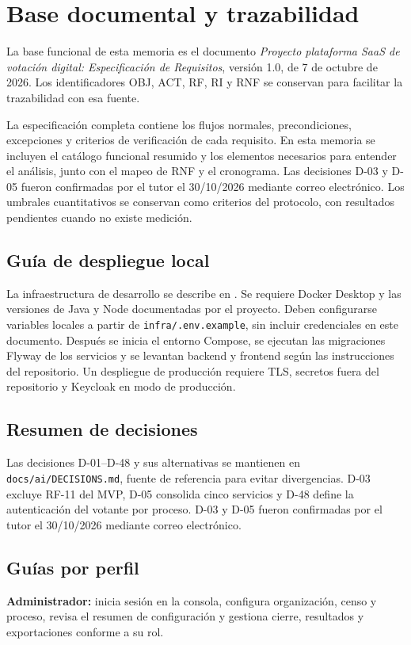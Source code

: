 \chapter{Base documental y trazabilidad}
\label{ap:base-documental}

La base funcional de esta memoria es el documento
\emph{Proyecto plataforma SaaS de votación digital: Especificación de
Requisitos}, versión 1.0, de 7 de octubre de 2026. Los identificadores OBJ,
ACT, RF, RI y RNF se conservan para facilitar la trazabilidad con esa fuente.

La especificación completa contiene los flujos normales, precondiciones,
excepciones y criterios de verificación de cada requisito. En esta memoria se
incluyen el catálogo funcional resumido y los elementos necesarios para
entender el análisis, junto con el mapeo de RNF y el cronograma. Las decisiones
D-03 y D-05 fueron confirmadas por el tutor el 30/10/2026 mediante correo
electrónico. Los umbrales
cuantitativos se conservan como criterios del protocolo, con resultados
pendientes cuando no existe medición.

\section{Guía de despliegue local}
La infraestructura de desarrollo se describe en
. Se requiere Docker
Desktop y las versiones de Java y Node documentadas por el proyecto. Deben
configurarse variables locales a partir de \texttt{infra/.env.example}, sin
incluir credenciales en este documento. Después se inicia el entorno Compose,
se ejecutan las migraciones Flyway de los servicios y se levantan backend y
frontend según las instrucciones del repositorio. Un despliegue de producción
requiere TLS, secretos fuera del repositorio y Keycloak en modo de producción.

\section{Resumen de decisiones}
Las decisiones D-01--D-48 y sus alternativas se mantienen en
\texttt{docs/ai/DECISIONS.md}, fuente de referencia para evitar divergencias.
D-03 excluye RF-11 del MVP, D-05 consolida cinco servicios y D-48 define la
autenticación del votante por proceso. D-03 y D-05 fueron confirmadas por el
tutor el 30/10/2026 mediante correo electrónico.

\section{Guías por perfil}
\textbf{Administrador:} inicia sesión en la consola, configura organización,
censo y proceso, revisa el resumen de configuración y gestiona cierre,
resultados y exportaciones conforme a su rol.

